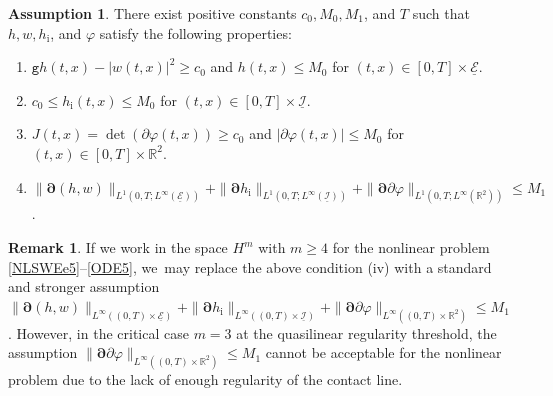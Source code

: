 \documentclass[11pt]{article}
\newenvironment{enumeratei}
{\bgroup\def\theenumi{\roman{enumi}}\def\theenumii{\arabic{enumii}}\begin{enumerate}}
{\end{enumerate}\egroup}
\newcommand{\gr}{{\mathtt g}}
\newcommand{\R}{{\mathbb R}}
\newcommand{\cI}{{\mathcal I}}
\newcommand{\cE}{{\mathcal E}}
\newcommand{\ul}[1]{\underline{#1}}
\theoremstyle{definition}
\newtheorem{assumption}[theorem]{Assumption}
\newtheorem{remark}[theorem]{Remark}
\begin{document}
\begin{assumption}\label{ass:LP}
There exist positive constants $c_0, M_0,M_1$, and $T$ such that $h,w,h_\mathrm{i}$, and $\varphi$ satisfy the following properties:
\begin{enumeratei}
\item\label{ass:LPi}
$\gr h(t,x)-|w(t,x)|^2\geq c_0$ and $h(t,x)\leq M_0$ for $(t,x)\in[0,T]\times\ul{\cE}$.
\item\label{ass:LPii}
$c_0 \leq h_\mathrm{i}(t,x) \leq M_0$ for $(t,x)\in[0,T]\times\ul{\cI}$.
\item\label{ass:LPiii}
$J(t,x)=\det(\partial\varphi(t,x))\geq c_0$ and $|\partial\varphi(t,x)|\leq M_0$ for $(t,x)\in[0,T]\times\R^2$.
\item\label{ass:LPiv}
$\|\bm{\partial}(h,w)\|_{L^1(0,T;L^\infty(\ul{\cE}))} + \|\bm{\partial} h_\mathrm{i}\|_{L^1(0,T;L^\infty(\ul{\cI}))}
+ \|\bm{\partial}\partial\varphi\|_{L^1(0,T;L^\infty(\R^2))} \leq M_1$.
\end{enumeratei}
\end{assumption}

\begin{remark}
If we work in the space $H^m$ with $m\geq4$ for the nonlinear problem \eqref{NLSWEe5}--\eqref{ODE5}, we~may replace the above condition {\rm (iv)}
with a standard and stronger assumption $\|\bm{\partial}(h,w)\|_{L^\infty((0,T)\times\ul{\cE})} + \|\bm{\partial} h_\mathrm{i}\|_{L^\infty((0,T)\times\ul{\cI})}
+ \|\bm{\partial}\partial\varphi\|_{L^\infty((0,T)\times\R^2)} \leq M_1$.
However, in the critical case $m=3$ at the quasilinear regularity threshold, the assumption $\|\bm{\partial}\partial\varphi\|_{L^\infty((0,T)\times\R^2)} \leq M_1$
cannot be acceptable for the nonlinear problem due to the lack of enough regularity of the contact line.
\end{remark}
\end{document}
